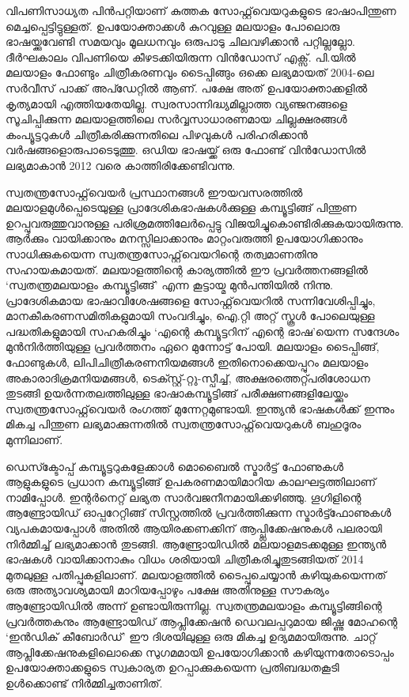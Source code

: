 \documentclass[12pt,twoside,a4paper]{article}
\begin{document}
വിപണിസാധ്യത പിൻപറ്റിയാണ് കുത്തക സോഫ്റ്റ്‌വെയറുകളുടെ ഭാഷാപിന്തുണ മെച്ചപ്പെട്ടിട്ടുള്ളത്. ഉപയോക്താക്കൾ കുറവുള്ള മലയാളം പോലൊരു ഭാഷയ്ക്കുവേണ്ടി സമയവും മൂലധനവും ഒരുപാടു ചിലവഴിക്കാൻ പറ്റില്ലല്ലോ. ദീർഘകാലം വിപണിയെ കീഴടക്കിയിരുന്ന വിൻഡോസ് എക്സ്. പി.യിൽ മലയാളം ഫോണ്ടും ചിത്രീകരണവും ടൈപ്പിങ്ങും ഒക്കെ ലഭ്യമായത് 2004-ലെ സർവീസ് പാക്ക് അപ്ഡേറ്റിൽ ആണ്. പക്ഷേ അത് ഉപയോക്താക്കളിൽ കൃത്യമായി എത്തിയതേയില്ല. സ്വരസാന്നിദ്ധ്യമില്ലാത്ത വ്യഞ്ജനങ്ങളെ സൂചിപ്പിക്കുന്ന മലയാളത്തിലെ സർവ്വസാധാരണമായ ചില്ലക്ഷരങ്ങൾ കംപ്യൂട്ടറുകൾ ചിത്രീകരിക്കുന്നതിലെ പിഴവുകൾ പരിഹരിക്കാൻ വർഷങ്ങളൊരുപാടെടുത്തു. ഒഡിയ ഭാഷയ്ക്ക് ഒരു ഫോണ്ട് വിൻഡോസിൽ ലഭ്യമാകാൻ 2012 വരെ കാത്തിരിക്കേണ്ടിവന്നു.

സ്വതന്ത്രസോഫ്റ്റ്‌വെയർ പ്രസ്ഥാനങ്ങൾ ഈയവസരത്തിൽ മലയാളമുൾപ്പെടെയുള്ള പ്രാദേശികഭാഷകൾക്കുള്ള കമ്പ്യൂട്ടിങ്ങ് പിന്തുണ ഉറപ്പുവരുത്തുവാനുള്ള പരിശ്രമത്തിലേർപ്പെട്ടു വിജയിച്ചുകൊണ്ടിരിക്കുകയായിരുന്നു. ആർക്കും വായിക്കാനും മനസ്സിലാക്കാനും മാറ്റംവരുത്തി ഉപയോഗിക്കാനും സാധിക്കുകയെന്ന സ്വതന്ത്രസോഫ്റ്റ്‌വെയറിന്റെ തത്വമാണതിനു സഹായകമായത്. മലയാളത്തിന്റെ കാര്യത്തിൽ ഈ പ്രവർത്തനങ്ങളിൽ `സ്വതന്ത്രമലയാളം കമ്പ്യൂട്ടിങ്ങ്' എന്ന കൂട്ടായ്മ മുൻപന്തിയിൽ നിന്നു. പ്രാദേശികമായ ഭാഷാവിശേഷങ്ങളെ സോഫ്റ്റ്‌വെയറിൽ സന്നിവേശിപ്പിച്ചും, മാനകീകരണസമിതികളുമായി സംവദിച്ചും, ഐ.റ്റി അറ്റ് സ്കൂൾ പോലെയുള്ള പദ്ധതികളുമായി സഹകരിച്ചും  `എന്റെ കമ്പ്യൂട്ടറിന് എന്റെ ഭാഷ'യെന്ന സന്ദേശം മുൻനിർത്തിയുള്ള പ്രവർത്തനം ഏറെ മുന്നോട്ട് പോയി. മലയാളം ടൈപ്പിങ്ങ്, ഫോണ്ടുകൾ, ലിപിചിത്രീകരണനിയമങ്ങൾ ഇതിനൊക്കെയപ്പുറം മലയാളം അകാരാദിക്രമനിയമങ്ങൾ, ടെക്സ്റ്റ്-റ്റു-സ്പീച്ച്, അക്ഷരത്തെറ്റ്പരിശോധന തുടങ്ങി ഉയർന്നതലത്തിലുള്ള ഭാഷാകമ്പ്യൂട്ടിങ്ങ് പരീക്ഷണങ്ങളിലേയ്ക്കും സ്വതന്ത്രസോഫ്റ്റ്‌വെയർ രംഗത്ത് മുന്നേറ്റമുണ്ടായി. ഇന്ത്യൻ ഭാഷകൾക്ക് ഇന്നും മികച്ച പിന്തുണ ലഭ്യമാക്കുന്നതിൽ സ്വതന്ത്രസോഫ്റ്റ്‌വെയറുകൾ ബഹുദൂരം മുന്നിലാണ്.

ഡെസ്ക്ടോപ്പ് കമ്പ്യൂട്ടറുകളേക്കാൾ മൊബൈൽ സ്മാർട്ട് ഫോണുകൾ ആളുകളുടെ പ്രധാന കമ്പ്യൂട്ടിങ്ങ് ഉപകരണമായിമാറിയ കാലഘട്ടത്തിലാണ് നാമിപ്പോൾ. ഇന്റർനെറ്റ് ലഭ്യത സാർവജനീനമായിക്കഴിഞ്ഞു. ഗൂഗിളിന്റെ ആണ്ട്രോയിഡ് ഓപ്പറേറ്റിങ്ങ് സിസ്റ്റത്തിൽ പ്രവർത്തിക്കുന്ന സ്മാർട്ട്ഫോണുകൾ വ്യപകമായപ്പോൾ അതിൽ ആയിരക്കണക്കിന് ആപ്പ്ലിക്കേഷനുകൾ പലരായി നിർമ്മിച്ച് ലഭ്യമാക്കാൻ തുടങ്ങി. ആണ്ട്രോയിഡിൽ മലയാളമടക്കമുള്ള ഇന്ത്യൻ ഭാഷകൾ വായിക്കാനാകും വിധം ശരിയായി ചിത്രീകരിച്ചുതുടങ്ങിയത് 2014 മുതലുള്ള പതിപ്പുകളിലാണ്. മലയാളത്തിൽ ടൈപ്പുചെയ്യാൻ കഴിയുകയെന്നത് ഒരു അത്യാവശ്യമായി മാറിയപ്പോഴും പക്ഷേ അതിനുള്ള സൗകര്യം ആണ്ട്രോയിഡിൽ അന്ന് ഉണ്ടായിരുന്നില്ല. സ്വതന്ത്രമലയാളം കമ്പ്യൂട്ടിങ്ങിന്റെ പ്രവർത്തകനും ആണ്ട്രോയിഡ് ആപ്ലിക്കേഷൻ ഡെവലപ്പറുമായ ജിഷ്ണു മോഹന്റെ `ഇൻഡിക് കീബോർഡ്' ഈ ദിശയിലുള്ള ഒരു  മികച്ച ഉദ്യമമായിരുന്നു. ചാറ്റ് ആപ്ലിക്കേഷനുകളിലൊക്കെ സുഗമമായി ഉപയോഗിക്കാൻ കഴിയുന്നതോടൊപ്പം ഉപയോക്താക്കളുടെ സ്വകാര്യത ഉറപ്പാക്കുകയെന്ന പ്രതിബദ്ധതകൂടി ഉൾക്കൊണ്ട് നിർമ്മിച്ചതാണിത്.
\end{document}
